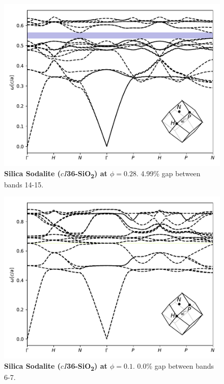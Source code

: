 \documentclass[fleqn,amsmath,amssymb,superscriptaddress, reprint,prl]{revtex4-1}
\begin{document}
\begin{figure}
\includegraphics[width=0.9\linewidth]{workspace/1b437d4222b80b86155c7593a8fb04cb/images/r=27.pdf}
	\caption{\textbf{Silica Sodalite ($cI$36-SiO\textsubscript{2}) at $\phi=0.28$}. 4.99\% gap between bands 14-15.}
\end{figure}

\begin{figure}
\includegraphics[width=0.9\linewidth]{workspace/1b437d4222b80b86155c7593a8fb04cb/images/r=35.pdf}
	\caption{\textbf{Silica Sodalite ($cI$36-SiO\textsubscript{2}) at $\phi=0.1$}. 0.0\% gap between bands 6-7.}
\end{figure}
\end{document}
